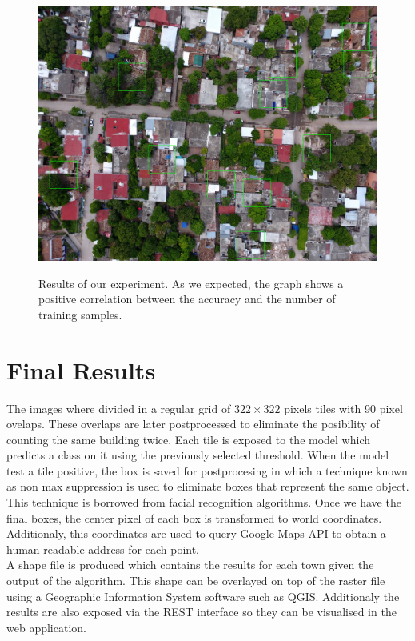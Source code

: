 \begin{figure}[h]
  \centering
  \includegraphics[width=\textwidth]{images/no-overlap.jpg}
  \label{fig:no-overlap}
  \caption{Results of our experiment. As we expected, the graph shows a positive correlation between the accuracy and the number of training samples.}
\end{figure}



\section{Final Results}

The images where divided in a regular grid of $322\times322$ pixels tiles with 90 pixel ovelaps. These overlaps are later postprocessed to eliminate the posibility of counting the same building twice. Each tile is exposed to the model which predicts a class on it using the previously selected threshold. When the model test a tile positive, the box is saved for postprocesing in which a technique known as non max suppression is used to eliminate boxes that represent the same object. This technique is borrowed from facial recognition algorithms. Once we have the final boxes, the center pixel of each box is transformed to world coordinates. Additionaly, this coordinates are used to query Google Maps API to obtain a human readable address for each point.\\

A shape file is produced which contains the results for each town given the output of the algorithm. This shape can be overlayed on top of the raster file using a Geographic Information System software such as QGIS. Additionaly the results are also exposed via the REST interface so they can be visualised in the web application.\\



